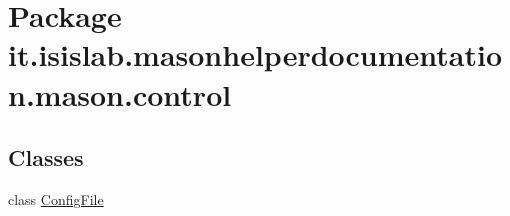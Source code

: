 \hypertarget{namespaceit_1_1isislab_1_1masonhelperdocumentation_1_1mason_1_1control}{\section{Package it.\-isislab.\-masonhelperdocumentation.\-mason.\-control}
\label{namespaceit_1_1isislab_1_1masonhelperdocumentation_1_1mason_1_1control}
}
\subsection*{Classes}
\begin{DoxyCompactItemize}
\item 
class \hyperlink{classit_1_1isislab_1_1masonhelperdocumentation_1_1mason_1_1control_1_1_config_file}{Config\-File}
\end{DoxyCompactItemize}
